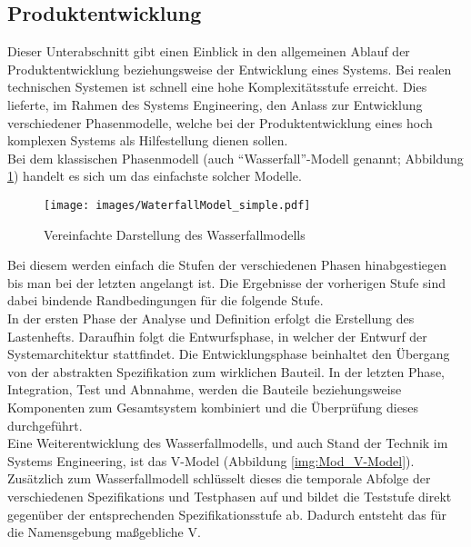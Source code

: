 \subsection{Produktentwicklung}
\label{subsec:ProDev}
Dieser Unterabschnitt gibt einen Einblick in den allgemeinen Ablauf der Produktentwicklung beziehungsweise der Entwicklung eines Systems. Bei realen technischen Systemen ist schnell eine hohe Komplexitätsstufe erreicht. Dies lieferte, im Rahmen des Systems Engineering,  den Anlass zur Entwicklung verschiedener Phasenmodelle, welche bei der Produktentwicklung eines hoch komplexen Systems als Hilfestellung dienen sollen.\\
Bei dem klassischen Phasenmodell (auch "`Wasserfall"'-Modell genannt; Abbildung \ref{img:Waterfal_Model}) handelt es sich um das einfachste solcher Modelle. 
\begin{figure}
	\centering
	\texttt{[image: images/WaterfallModel\_simple.pdf]}
	\caption{Vereinfachte Darstellung des Wasserfallmodells}
	\label{img:Waterfal_Model}
\end{figure}
Bei diesem werden einfach die Stufen der verschiedenen Phasen hinabgestiegen bis man bei der letzten angelangt ist. Die Ergebnisse der vorherigen Stufe sind dabei bindende Randbedingungen für die folgende Stufe.\\ 
In der ersten Phase der Analyse und Definition erfolgt die Erstellung des Lastenhefts. Daraufhin folgt die Entwurfsphase, in welcher der Entwurf der Systemarchitektur stattfindet. Die Entwicklungsphase beinhaltet den Übergang von der abstrakten Spezifikation zum wirklichen Bauteil. In der letzten Phase, Integration, Test und Abnnahme, werden die Bauteile beziehungsweise Komponenten zum Gesamtsystem kombiniert und die Überprüfung dieses durchgeführt.\\ 
Eine Weiterentwicklung des Wasserfallmodells, und auch Stand der Technik im Systems Engineering, ist das V-Model (Abbildung \ref{img:Mod_V-Model}).
Zusätzlich zum Wasserfallmodell schlüsselt dieses die temporale Abfolge der verschiedenen Spezifikations und Testphasen auf und bildet die Teststufe direkt gegenüber der entsprechenden Spezifikationsstufe ab. Dadurch entsteht das für die Namensgebung maßgebliche V.
